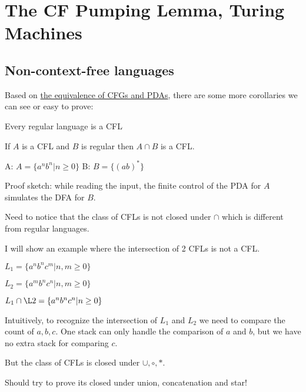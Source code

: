 \chapter{The CF Pumping Lemma, Turing Machines}

\section{Non-context-free languages}

Based on \hyperref[theorem: CFG=PDA]{the equivalence of CFGs and PDAs}, there are some more corollaries we can see or easy to prove:

\begin{corollary}
    Every regular language is a CFL
\end{corollary}

\begin{corollary}
    If \(A\) is a CFL and \(B\) is regular then \(A \cap B\) is a CFL. 

    \begin{example}
        A: \(A = \{ a^nb^n | n \geq 0\} \) 
        B: \(B = \{ (ab)^* \} \) 
    \end{example}

    Proof sketch: while reading the input, the finite control of the PDA for \(A\) simulates the DFA for \(B\).  
\end{corollary}

Need to notice that the class of CFLs is not closed under \(\cap\) which is different from regular languages.

\begin{example}
    I will show an example where the intersection of 2 CFLs is not a CFL.

    \(L_1 = \{ a^n b^n c^m | n, m \geq 0 \} \) 

    \(L_2 = \{ a^m b^n c^n | n, m \geq 0 \} \) 

    \(L_1 \cap \L2 = \{ a^n b^n c^n | n \geq 0\} \) 

    Intuitively, to recognize the intersection of \(L_1\) and \(L_2\) we need to compare the count of \(a, b, c\). One stack can only handle the comparison of \(a\) and \(b\), but we have no extra stack for comparing \(c\).      
\end{example}

But the class of CFLs is closed under \(\cup, \circ, *\).  
\begin{note}
    Should try to prove its closed under union, concatenation and star!
\end{note}

